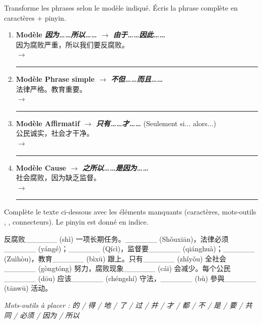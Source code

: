 \documentclass[11pt]{article}
\newcommand{\zh}[1]{\ifmmode\text{#1}\else{#1}\fi}
\begin{document}
\begin{exercice}
Transforme les phrases selon le modèle indiqué. Écris la phrase complète en caractères + pinyin.

\begin{enumerate}
    \item \textbf{Modèle \emph{因为……所以……} $\rightarrow$ \emph{由于……因此……}} \\
    因为腐败严重，所以我们要反腐败。 \\
    $\rightarrow$ \rule{\linewidth}{0.4pt}
    \item \textbf{Modèle Phrase simple $\rightarrow$ \emph{不但……而且……}} \\
    法律严格。教育重要。 \\
    $\rightarrow$ \rule{\linewidth}{0.4pt}
    \item \textbf{Modèle Affirmatif $\rightarrow$ \emph{只有……才……}} (Seulement si... alors...) \\
    公民诚实，社会才干净。 \\
    $\rightarrow$ \rule{\linewidth}{0.4pt}
    \item \textbf{Modèle Cause $\rightarrow$ \emph{之所以……是因为……}} \\
    社会腐败，因为缺乏监督。 \\
    $\rightarrow$ \rule{\linewidth}{0.4pt}
\end{enumerate}
\end{exercice}

\begin{exercice}
Complète le texte ci-dessous avec les éléments manquants (caractères, mots-outils \zh{的/得/地}, \zh{了/过}, connecteurs). Le pinyin est donné en indice.

\begin{textebox}
反腐败\_\_\_\_\_\_ (shì) 一项长期任务。\_\_\_\_\_\_ (Shǒuxiān)，法律必须\_\_\_\_\_\_ (yángé)；\_\_\_\_\_\_ (Qícì)，监督要\_\_\_\_\_\_ (qiánghuà)；\_\_\_\_\_\_ (Zuìhòu)，教育\_\_\_\_\_\_ (bìxū) 跟上。只有\_\_\_\_\_\_ (zhǐyǒu) 全社会\_\_\_\_\_\_ (gòngtóng) 努力，腐败现象\_\_\_\_\_\_ (cái) 会减少。每个公民\_\_\_\_\_\_ (dōu) 应该\_\_\_\_\_\_ (chéngshí) 守法，\_\_\_\_\_\_ (bù) 參與\_\_\_\_\_\_ (tānwū) 活动。
\end{textebox}

\textit{Mots-outils à placer : 的 / 得 / 地 / 了 / 过 / 并 / 才 / 都 / 不 / 是 / 要 / 共同 / 必须 / 因为 / 所以}
\end{exercice}
\end{document}
